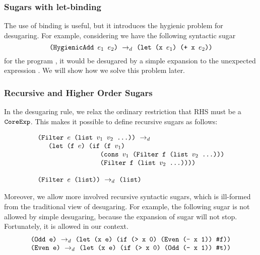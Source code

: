 \subsubsection{Sugars with let-binding}
The use of  binding is useful, but it introduces the hygienic problem for desugaring. For example, considering we have the following syntactic sugar
\[
\texttt{(HygienicAdd $e_1$ $e_2$)} ~\rightarrow_d~ \texttt{(let (x $e_1$) (+ x $e_2$))}
\]
for the program , it would be desugared by a simple expansion to the unexpected expression . We will show how we solve this problem later.

\subsubsection{Recursive and Higher Order Sugars}
In the desugaring rule, we relax the ordinary restriction that RHS must be a $\mbox{\tt CoreExp}$. This makes it possible to define recursive sugars as follows:

\[\begin{array}{l}
	\texttt{(Filter $e$ (list $v_1$ $v_2$ ...))} ~\rightarrow_d~\\
	\quad
	\texttt{ (let (f $e$) (if (f $v_1$)}\\
	\qquad\qquad\qquad\qquad\ \texttt{ (cons $v_1$ (Filter f (list $v_2$ ...)))}\\
	\qquad\qquad\qquad\qquad\ \texttt{ (Filter f (list $v_2$ ...))))}\\
\\
	\texttt{(Filter $e$ (list))} ~\rightarrow_d~ \texttt{(list)}
	\end{array}
\]

Moreover, we allow more involved recursive syntactic sugars, which is ill-formed from the traditional view of desugaring. For example, the following sugar is not allowed by simple desugaring, because the expansion of sugar will not stop. Fortunately, it is allowed in our context.
\[
\begin{array}{l}
\texttt{(Odd e)} ~\rightarrow_d~ \texttt{(let (x~e)~(if~(>~x~0)~(Even~(-~x~1))~\mbox{\tt \#f}))}\\
\texttt{(Even e)} ~\rightarrow_d~ \texttt{(let (x~e)~(if~(>~x~0)~(Odd~(-~x~1))~\mbox{\tt \#t}))}
\end{array}
\]

